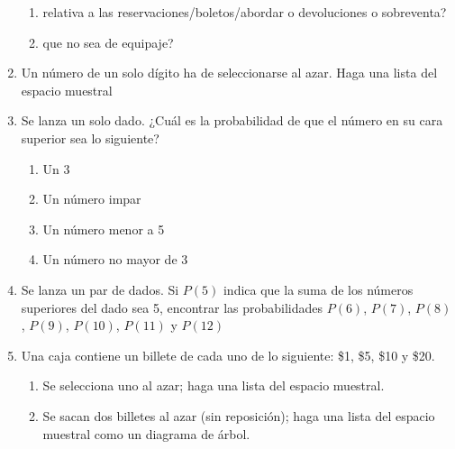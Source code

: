 \documentclass[11pt,twoside]{article}
\begin{document}
\begin{enumerate}
\begin{enumerate}
 \item relativa a las reservaciones/boletos/abordar o devoluciones o sobreventa?
 \item que no sea de equipaje?
\end{enumerate}
\item Un número de un solo dígito ha de seleccionarse al azar. Haga una lista del espacio muestral
\item Se lanza un solo dado. ¿Cuál es la probabilidad de que el número en su cara superior sea lo siguiente?
\begin{enumerate}
 \item Un 3
 \item Un número impar
 \item Un número menor a 5
 \item Un número no mayor de 3
\end{enumerate}
\item Se lanza un par de dados. Si $P(5)$ indica que la suma de los números superiores del dado sea 5, encontrar las probabilidades $P(6)$, $P(7)$, $P(8)$, $P(9)$, $P(10)$, $P(11)$ y $P(12)$
\item  Una caja contiene un billete de cada uno de lo
siguiente: \$1, \$5, \$10 y \$20.
\begin{enumerate}
 \item Se selecciona uno al azar; haga una lista del espacio muestral.
 \item Se sacan dos billetes al azar (sin reposición); haga una lista del espacio muestral como un diagrama de árbol.
\end{enumerate}
 \end{enumerate}
\end{document}
